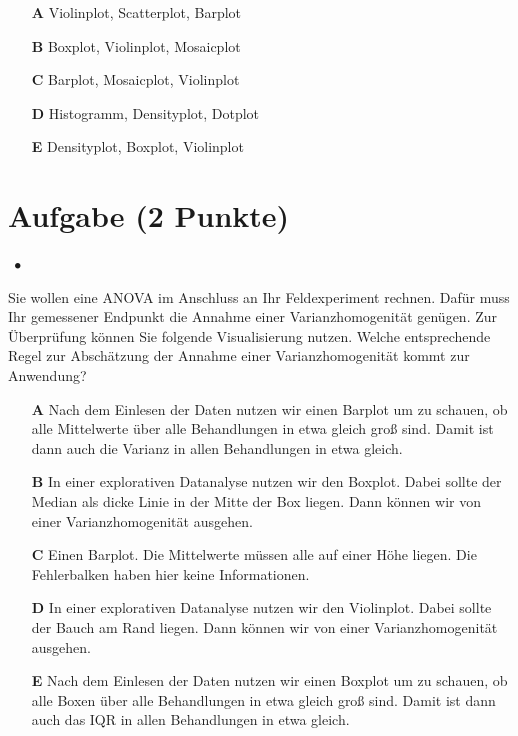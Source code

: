 \documentclass[a4paper, 9pt]{scrartcl}\usepackage[]{graphicx}\usepackage[]{xcolor}
\begin{document}
\begin{enumerate}
\item [\textbf{A} \msquare] Violinplot, Scatterplot, Barplot
\item [\textbf{B} \msquare] Boxplot, Violinplot, Mosaicplot
\item [\textbf{C} \msquare] Barplot, Mosaicplot, Violinplot
\item [\textbf{D} \msquare] Histogramm, Densityplot, Dotplot
\item [\textbf{E} \msquare] Densityplot, Boxplot, Violinplot
\end{enumerate}

\section{Aufgabe \hfill (2 Punkte)}


\ifcollection
\begin{flushright}
\tiny\vspace{-2Ex}
\textbf{\examinhaltstart}
\exammodulestatversuch $\;\bullet$
\exammodulebiostat
\vspace{-1Ex}
\end{flushright}
\fi




Sie wollen eine ANOVA im Anschluss an Ihr Feldexperiment rechnen. Dafür muss Ihr gemessener Endpunkt die Annahme einer Varianzhomogenität genügen. Zur Überprüfung können Sie folgende Visualisierung nutzen. Welche entsprechende Regel zur Abschätzung der Annahme einer Varianzhomogenität kommt zur Anwendung?



\begin{enumerate}
\item [\textbf{A} \msquare] Nach dem Einlesen der Daten nutzen wir einen Barplot um zu schauen, ob alle Mittelwerte über alle Behandlungen in etwa gleich groß sind. Damit ist dann auch die Varianz in allen Behandlungen in etwa gleich.
\item [\textbf{B} \msquare] In einer explorativen Datanalyse nutzen wir den Boxplot. Dabei sollte der Median als dicke Linie in der Mitte der Box liegen. Dann können wir von einer Varianzhomogenität ausgehen.
\item [\textbf{C} \msquare] Einen Barplot. Die Mittelwerte müssen alle auf einer Höhe liegen. Die Fehlerbalken haben hier keine Informationen.
\item [\textbf{D} \msquare] In einer explorativen Datanalyse nutzen wir den Violinplot. Dabei sollte der Bauch am Rand liegen. Dann können wir von einer Varianzhomogenität ausgehen.
\item [\textbf{E} \msquare] Nach dem Einlesen der Daten nutzen wir einen Boxplot um zu schauen, ob alle Boxen über alle Behandlungen in etwa gleich groß sind. Damit ist dann auch das IQR in allen Behandlungen in etwa gleich.
\end{enumerate}
\end{document}
